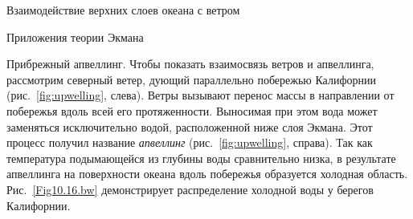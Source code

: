 \begin{chapter}{Взаимодействие верхних слоев океана с ветром}
\begin{section}{Приложения теории Экмана}
\begin{paragraph}{Прибрежный апвеллинг.}
Чтобы показать взаимосвязь ветров
и апвеллинга, рассмотрим северный ветер,
дующий параллельно побережью Калифорнии (рис.~\ref{fig:upwelling}, слева). 
Ветры вызывают перенос массы в направлении
от побережья вдоль всей его протяженности. Выносимая при этом вода может
заменяться исключительно водой, расположенной ниже слоя Экмана. Этот процесс
получил название \textit{апвеллинг} 
(рис.~\ref{fig:upwelling}, справа). Так как температура подымающейся из 
глубины воды сравнительно низка, в результате апвеллинга на поверхности океана
вдоль побережья образуется холодная область. Рис.~\ref{Fig10.16.bw}
демонстрирует распределение холодной воды у берегов Калифорнии.
%


\end{paragraph}
\end{section}
\end{chapter}
